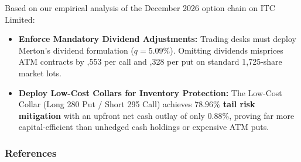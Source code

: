 Based on our empirical analysis of the December 2026 option chain on ITC Limited:
\begin{itemize}[leftmargin=1.5em, itemsep=1pt, parsep=0pt]
    \item \textbf{Enforce Mandatory Dividend Adjustments:} Trading desks must deploy Merton's dividend formulation ($q = 5.09\%$). Omitting dividends misprices ATM contracts by ,553 per call and ,328 per put on standard 1,725-share market lots.
    \item \textbf{Deploy Low-Cost Collars for Inventory Protection:} The Low-Cost Collar (Long 280 Put / Short 295 Call) achieves \textbf{$78.96\%$ tail risk mitigation} with an upfront net cash outlay of only $0.88\%$, proving far more capital-efficient than unhedged cash holdings or expensive ATM puts.
\end{itemize}

\vspace{-0.4em}

\begingroup
\footnotesize
\setlength{\bibsep}{1.2pt}
\renewcommand{\section}[2]{}%
\subsubsection*{References}


\endgroup
